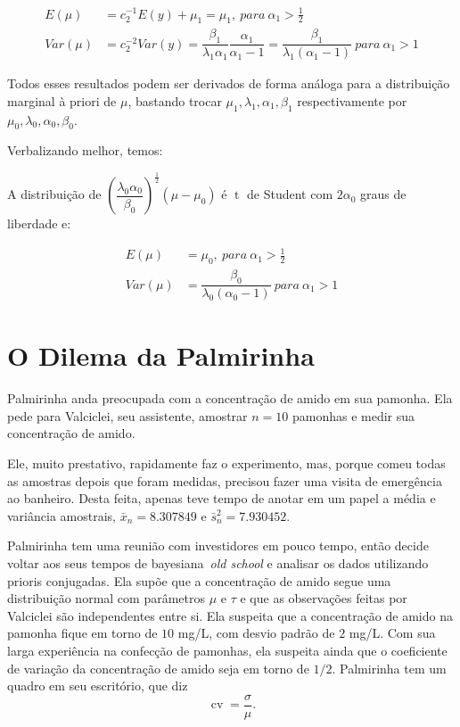 \documentclass[a4paper]{article}
\newcommand{\op}[1]{{\operatorname{#1}}}
\begin{document}
\begin{align*}
	E(\mu)&=c_2^{-1}E(y)+\mu_1=\mu_1,~para~\alpha_1>\frac12\\
	Var(\mu)&=c_2^{-2}Var(y)=\dfrac{\beta_1}{\lambda_1\alpha_1}\dfrac{\alpha_1}{\alpha_1-1}=\dfrac{\beta_1}{\lambda_1(\alpha_1-1)}~para~\alpha_1>1
\end{align*}

Todos esses resultados podem ser derivados de forma análoga para a distribuição marginal à priori de $\mu$, bastando trocar $\mu_1,\lambda_1,\alpha_1,\beta_1$ respectivamente por $\mu_0,\lambda_0,\alpha_0,\beta_0$.

Verbalizando melhor, temos:

\begin{theorem}
	\label{priorvar}
	A distribuição de $\left(\dfrac{\lambda_0\alpha_0}{\beta_0}\right)^{\frac12}(\mu-\mu_0)$ é $\op{t}$ de Student com $2\alpha_0$ graus de liberdade e:
	
	\begin{align*}
	E(\mu)&=\mu_0,~para~\alpha_1>\frac12\\
	Var(\mu)&=\dfrac{\beta_0}{\lambda_0(\alpha_0-1)}~para~\alpha_1>1
	\end{align*}
	

	
\end{theorem}
\section{O Dilema da Palmirinha}

Palmirinha anda preocupada com a concentração de amido em sua pamonha.
Ela pede para Valciclei, seu assistente, amostrar $n=10$ pamonhas e medir sua concentração de amido.

Ele, muito prestativo, rapidamente faz o experimento, mas, porque comeu todas as amostras depois que foram medidas, precisou fazer uma visita de emergência ao banheiro. 
Desta feita, apenas teve tempo de anotar em um papel a média e variância amostrais, $\bar{x}_n =  8.307849$ e $\bar{s}^2_n = 7.930452$.

Palmirinha tem uma reunião com investidores em pouco tempo, então decide voltar aos seus tempos de bayesiana~\textit{old school} e analisar os dados utilizando prioris conjugadas.
Ela supõe que a concentração de amido segue uma distribuição normal com parâmetros $\mu$ e $\tau$ e que as observações feitas por Valciclei são independentes entre si.
Ela suspeita que a concentração de amido na pamonha fique em torno de $10$ mg/L, com desvio padrão de  $2$ mg/L.
Com sua larga experiência na confecção de pamonhas, ela suspeita ainda que o coeficiente de variação da concentração de amido seja em torno de $1/2$.
Palmirinha tem um quadro em seu escritório, que diz
\[ \operatorname{cv} = \frac{\sigma}{\mu}. \]
\end{document}
